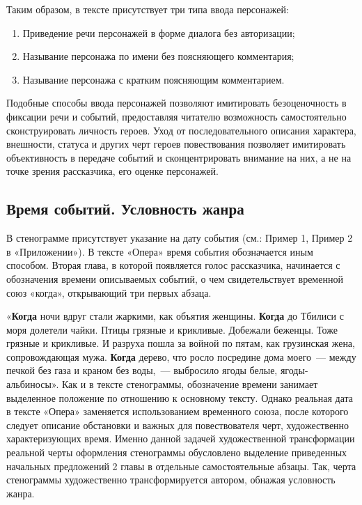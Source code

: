 \documentclass{kursa4}
\begin{document}
        Таким образом, в тексте присутствует три типа ввода персонажей: 

        \begin{enumerate}
          \item Приведение речи персонажей в форме диалога без авторизации; \item Называние персонажа по имени без поясняющего комментария; \item Называние персонажа с кратким поясняющим комментарием. \end{enumerate}

        Подобные способы ввода персонажей позволяют имитировать безоценочность в фиксации речи и событий, предоставляя читателю возможность самостоятельно сконструировать личность героев. Уход от последовательного описания характера, внешности, статуса и других черт героев повествования позволяет имитировать объективность в передаче событий и сконцентрировать внимание на них, а не на точке зрения рассказчика, его оценке персонажей. 

      \subsection{Время событий. Условность жанра}

        В стенограмме присутствует указание на дату события (см.: Пример 1, Пример 2 в «Приложении»). В тексте «Опера» время события обозначается иным способом. Вторая глава, в которой появляется голос рассказчика, начинается с обозначения времени описываемых событий, о чем свидетельствует временной союз «когда», открывающий три первых абзаца. 

        «\textbf{Когда} ночи вдруг стали жаркими, как объятия женщины. \textbf{Когда} до Тбилиси с моря долетели чайки. Птицы грязные и крикливые. Добежали беженцы. Тоже грязные и крикливые. И разруха пошла за войной по пятам, как грузинская жена, сопровождающая мужа. \textbf{Когда} дерево, что росло посредине дома моего~--- между печкой без газа и краном без воды,~--- выбросило ягоды белые, ягоды-альбиносы». Как и в тексте стенограммы, обозначение времени занимает выделенное положение по отношению к основному тексту. Однако реальная дата в тексте «Опера» заменяется использованием временного союза, после которого следует описание обстановки и важных для повествователя черт, художественно характеризующих время. Именно данной задачей художественной трансформации реальной черты оформления стенограммы обусловлено выделение приведенных начальных предложений 2 главы в отдельные самостоятельные абзацы. Так, черта стенограммы художественно трансформируется автором, обнажая условность жанра. 
\end{document}

